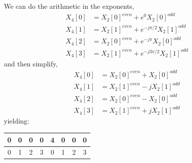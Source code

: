 We can do the arithmetic in the exponents,
\begin{align*}
  X_4[0] &= X_2[0]^{\mathit{even}} +   e^0 X_2[0]^{\mathit{odd}} \\
  X_4[1] &= X_2[1]^{\mathit{even}} +   e^{-j\pi/2} X_2[1]^{\mathit{odd}} \\
  X_4[2] &= X_2[0]^{\mathit{even}} +   e^{-j\pi} X_2[0]^{\mathit{odd}} \\
  X_4[3] &= X_2[1]^{\mathit{even}} +   e^{-j3\pi/2}X_2[1]^{\mathit{odd}}
\end{align*}
and then simplify,
\begin{align*}
  X_4[0] &= X_2[0]^{\mathit{even}} +   X_2[0]^{\mathit{odd}} \\
  X_4[1] &= X_2[1]^{\mathit{even}} -   j X_2[1]^{\mathit{odd}} \\
  X_4[2] &= X_2[0]^{\mathit{even}} -   X_2[0]^{\mathit{odd}} \\
  X_4[3] &= X_2[1]^{\mathit{even}} +   j X_2[1]^{\mathit{odd}}
\end{align*}
yielding:
\begin{center}
  \begin{tabular}{|c|c|c|c||c|c|c|c|} \hline
    0   & 0   & 0   & 0   & 4   & 0   & 0   & 0   \\ \hline
    0   & 1   & 2   & 3   & 0   & 1   & 2   & 3   \\ \hline
  \end{tabular}
\end{center}

